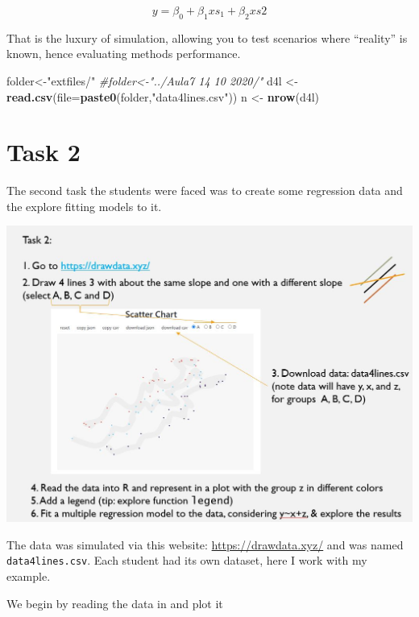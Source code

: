 \documentclass[
]{book}
\newenvironment{Shaded}{\begin{snugshade}}{\end{snugshade}}
\newcommand{\AttributeTok}[1]{\textcolor[rgb]{0.13,0.29,0.53}{#1}}
\newcommand{\CommentTok}[1]{\textcolor[rgb]{0.56,0.35,0.01}{\textit{#1}}}
\newcommand{\FunctionTok}[1]{\textcolor[rgb]{0.13,0.29,0.53}{\textbf{#1}}}
\newcommand{\NormalTok}[1]{#1}
\newcommand{\OtherTok}[1]{\textcolor[rgb]{0.56,0.35,0.01}{#1}}
\newcommand{\StringTok}[1]{\textcolor[rgb]{0.31,0.60,0.02}{#1}}
\begin{document}
\[y=\beta_0+\beta_1 xs_1+\beta_2 xs2\]

That is the luxury of simulation, allowing you to test scenarios where ``reality'' is known, hence evaluating methods performance.

\begin{Shaded}
\begin{Highlighting}[]
\NormalTok{folder}\OtherTok{\textless{}{-}}\StringTok{"extfiles/"}
\CommentTok{\#folder\textless{}{-}"../Aula7 14 10 2020/"}
\NormalTok{d4l }\OtherTok{\textless{}{-}} \FunctionTok{read.csv}\NormalTok{(}\AttributeTok{file=}\FunctionTok{paste0}\NormalTok{(folder,}\StringTok{"data4lines.csv"}\NormalTok{))}
\NormalTok{n }\OtherTok{\textless{}{-}} \FunctionTok{nrow}\NormalTok{(d4l)}
\end{Highlighting}
\end{Shaded}

\hypertarget{task-2}{%
\section{Task 2}\label{task-2}}

The second task the students were faced was to create some regression data and the explore fitting models to it.

\includegraphics{extfiles/Aula7Task7.JPG}

The data was simulated via this website: \url{https://drawdata.xyz/} and was named \texttt{data4lines.csv}. Each student had its own dataset, here I work with my example.

We begin by reading the data in and plot it
\end{document}
